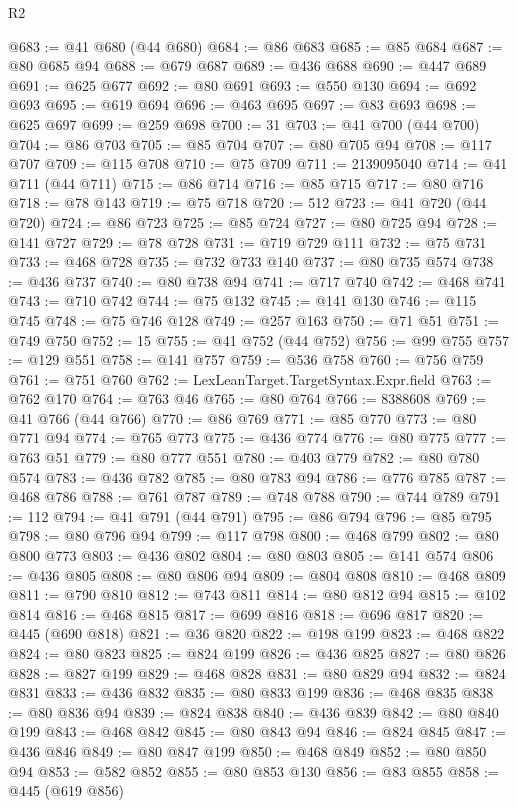 \begin{lexlean}{R2}
\begin{coremodule}
@683 := @41 @680 (@44 @680)
@684 := @86 @683
@685 := @85 @684
@687 := @80 @685 @94
@688 := @679 @687
@689 := @436 @688
@690 := @447 @689
@691 := @625 @677
@692 := @80 @691
@693 := @550 @130
@694 := @692 @693
@695 := @619 @694
@696 := @463 @695
@697 := @83 @693
@698 := @625 @697
@699 := @259 @698
@700 := 31
@703 := @41 @700 (@44 @700)
@704 := @86 @703
@705 := @85 @704
@707 := @80 @705 @94
@708 := @117 @707
@709 := @115 @708
@710 := @75 @709
@711 := 2139095040
@714 := @41 @711 (@44 @711)
@715 := @86 @714
@716 := @85 @715
@717 := @80 @716
@718 := @78 @143
@719 := @75 @718
@720 := 512
@723 := @41 @720 (@44 @720)
@724 := @86 @723
@725 := @85 @724
@727 := @80 @725 @94
@728 := @141 @727
@729 := @78 @728
@731 := @719 @729 @111
@732 := @75 @731
@733 := @468 @728
@735 := @732 @733 @140
@737 := @80 @735 @574
@738 := @436 @737
@740 := @80 @738 @94
@741 := @717 @740
@742 := @468 @741
@743 := @710 @742
@744 := @75 @132
@745 := @141 @130
@746 := @115 @745
@748 := @75 @746 @128
@749 := @257 @163
@750 := @71 @51
@751 := @749 @750
@752 := 15
@755 := @41 @752 (@44 @752)
@756 := @99 @755
@757 := @129 @551
@758 := @141 @757
@759 := @536 @758
@760 := @756 @759
@761 := @751 @760
@762 := LexLeanTarget.TargetSyntax.Expr.field
@763 := @762 @170
@764 := @763 @46
@765 := @80 @764
@766 := 8388608
@769 := @41 @766 (@44 @766)
@770 := @86 @769
@771 := @85 @770
@773 := @80 @771 @94
@774 := @765 @773
@775 := @436 @774
@776 := @80 @775
@777 := @763 @51
@779 := @80 @777 @551
@780 := @403 @779
@782 := @80 @780 @574
@783 := @436 @782
@785 := @80 @783 @94
@786 := @776 @785
@787 := @468 @786
@788 := @761 @787
@789 := @748 @788
@790 := @744 @789
@791 := 112
@794 := @41 @791 (@44 @791)
@795 := @86 @794
@796 := @85 @795
@798 := @80 @796 @94
@799 := @117 @798
@800 := @468 @799
@802 := @80 @800 @773
@803 := @436 @802
@804 := @80 @803
@805 := @141 @574
@806 := @436 @805
@808 := @80 @806 @94
@809 := @804 @808
@810 := @468 @809
@811 := @790 @810
@812 := @743 @811
@814 := @80 @812 @94
@815 := @102 @814
@816 := @468 @815
@817 := @699 @816
@818 := @696 @817
@820 := @445 (@690 @818)
@821 := @36 @820
@822 := @198 @199
@823 := @468 @822
@824 := @80 @823
@825 := @824 @199
@826 := @436 @825
@827 := @80 @826
@828 := @827 @199
@829 := @468 @828
@831 := @80 @829 @94
@832 := @824 @831
@833 := @436 @832
@835 := @80 @833 @199
@836 := @468 @835
@838 := @80 @836 @94
@839 := @824 @838
@840 := @436 @839
@842 := @80 @840 @199
@843 := @468 @842
@845 := @80 @843 @94
@846 := @824 @845
@847 := @436 @846
@849 := @80 @847 @199
@850 := @468 @849
@852 := @80 @850 @94
@853 := @582 @852
@855 := @80 @853 @130
@856 := @83 @855
@858 := @445 (@619 @856)

\end{coremodule}
\end{lexlean}
